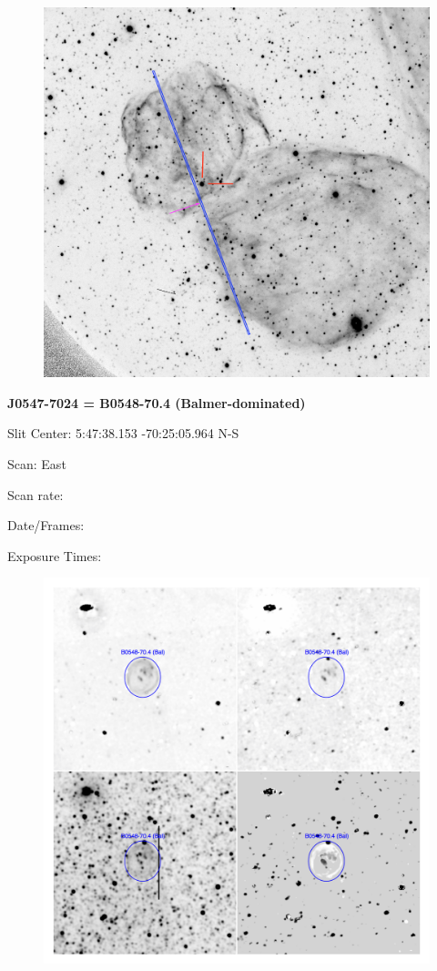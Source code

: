\documentclass[11pt]{article}
\begin{document}
\begin{figure}
\includegraphics[width=12.5cm]{snapshots/DEML316_longslit.png}
\end{figure}

\newpage 
 
 
{\bf J0547-7024 = B0548-70.4 (Balmer-dominated)}

Slit Center:  5:47:38.153   -70:25:05.964  N-S

Scan:  East

Scan rate:  

Date/Frames:

Exposure Times:  

\begin{figure}
\includegraphics[width=11.cm]{snapshots/B0548-704.png}
\end{figure}
\end{document}

